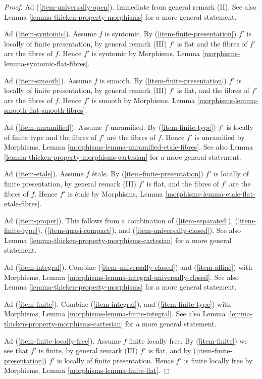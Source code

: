 \documentclass[10pt,a4paper]{amsart}
\theoremstyle{plain}
\theoremstyle{definition}
\theoremstyle{remark}
\numberwithin{equation}{subsection}
\begin{document}
\begin{proof}
\medskip\noindent
Ad (\ref{item-universally-open}). Immediate from general remark (II). See also
Lemma \ref{lemma-thicken-property-morphisms} for a more general statement.

\medskip\noindent
Ad (\ref{item-syntomic}). Assume $f$ is syntomic. By
(\ref{item-finite-presentation}) $f'$ is locally of finite presentation,
by general remark (III) $f'$ is flat and the fibres of $f'$ are the fibres
of $f$. Hence $f'$ is syntomic by
Morphisms, Lemma \ref{morphisms-lemma-syntomic-flat-fibres}.

\medskip\noindent
Ad (\ref{item-smooth}). Assume $f$ is smooth. By
(\ref{item-finite-presentation}) $f'$ is locally of finite presentation,
by general remark (III) $f'$ is flat, and the fibres of $f'$ are the
fibres of $f$. Hence $f'$ is smooth by
Morphisms, Lemma \ref{morphisms-lemma-smooth-flat-smooth-fibres}.

\medskip\noindent
Ad (\ref{item-unramified}). Assume $f$ unramified. By
(\ref{item-finite-type}) $f'$ is locally of finite type
and the fibres of $f'$ are the fibres of $f$.
Hence $f'$ is unramified by
Morphisms, Lemma \ref{morphisms-lemma-unramified-etale-fibres}. See also
Lemma \ref{lemma-thicken-property-morphisms-cartesian}
for a more general statement.

\medskip\noindent
Ad (\ref{item-etale}). Assume $f$ \'etale. By
(\ref{item-finite-presentation}) $f'$ is locally of finite presentation,
by general remark (III) $f'$ is flat, and the fibres of $f'$ are the fibres
of $f$. Hence $f'$ is \'etale by
Morphisms, Lemma \ref{morphisms-lemma-etale-flat-etale-fibres}.

\medskip\noindent
Ad (\ref{item-proper}). This follows from a combination of
(\ref{item-separated}), (\ref{item-finite-type}), (\ref{item-quasi-compact}),
and (\ref{item-universally-closed}).  See also
Lemma \ref{lemma-thicken-property-morphisms-cartesian}
for a more general statement.

\medskip\noindent
Ad (\ref{item-integral}). Combine (\ref{item-universally-closed}) and
(\ref{item-affine}) with
Morphisms, Lemma \ref{morphisms-lemma-integral-universally-closed}. See also
Lemma \ref{lemma-thicken-property-morphisms} for a more general statement.

\medskip\noindent
Ad (\ref{item-finite}). Combine (\ref{item-integral}),
and (\ref{item-finite-type}) with
Morphisms, Lemma \ref{morphisms-lemma-finite-integral}. See also
Lemma \ref{lemma-thicken-property-morphisms-cartesian}
for a more general statement.

\medskip\noindent
Ad (\ref{item-finite-locally-free}). Assume $f$ finite locally free. By
(\ref{item-finite}) we see that $f'$ is finite, by general remark (III)
$f'$ is flat, and by (\ref{item-finite-presentation}) $f'$ is locally of finite
presentation. Hence $f'$ is finite locally free by
Morphisms, Lemma \ref{morphisms-lemma-finite-flat}.
\end{proof}
\end{document}
